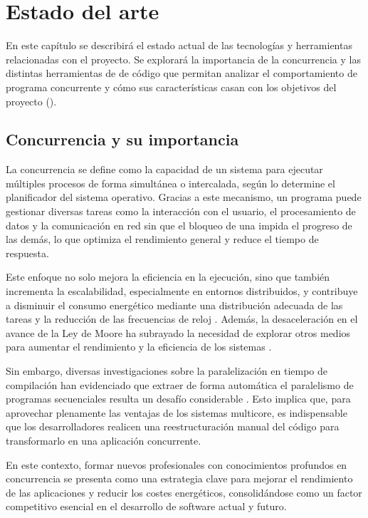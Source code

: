 \chapter{Estado del arte}\label{chap:estado-del-arte}
En este capítulo se describirá el estado actual de las tecnologías y herramientas relacionadas con el proyecto. Se explorará la importancia de la concurrencia y las distintas herramientas de  de código que permitan analizar el comportamiento de \gls{programa concurrente} y cómo sus características casan con los objetivos del proyecto ().

\section{Concurrencia y su importancia}\label{sec:concurrencia-importancia}

La \gls{concurrencia} \cite{ParallelismComputerArchitecture} se define como la capacidad de un sistema para ejecutar múltiples \glspl{proceso} de forma simultánea o intercalada, según lo determine el \gls{planificador} del sistema operativo. Gracias a este mecanismo, un programa puede gestionar diversas tareas como la interacción con el usuario, el procesamiento de datos y la comunicación en red sin que el bloqueo de una impida el progreso de las demás, lo que optimiza el rendimiento general y reduce el tiempo de respuesta.

Este enfoque no solo mejora la eficiencia en la ejecución, sino que también incrementa la escalabilidad, especialmente en entornos distribuidos, y contribuye a disminuir el consumo energético mediante una distribución adecuada de las tareas y la reducción de las frecuencias de reloj \cite{EnergyEfficiencyParallelAplications}. Además, la desaceleración en el avance de la Ley de Moore \cite{LeyMoore} ha subrayado la necesidad de explorar otros medios para aumentar el rendimiento y la eficiencia de los sistemas \cite{ParallelProgramming}.

Sin embargo, diversas investigaciones sobre la paralelización en \gls{tiempo de compilación} han evidenciado que extraer de forma automática el \gls{paralelismo} de programas secuenciales resulta un desafío considerable \cite{ParallelProgramming}. Esto implica que, para aprovechar plenamente las ventajas de los \gls{sistemas multicore}, es indispensable que los desarrolladores realicen una reestructuración manual del código para transformarlo en una aplicación concurrente.

En este contexto, formar nuevos profesionales con conocimientos profundos en \gls{concurrencia} se presenta como una estrategia clave para mejorar el rendimiento de las aplicaciones y reducir los costes energéticos, consolidándose como un factor competitivo esencial en el desarrollo de \gls{software} actual y futuro.


